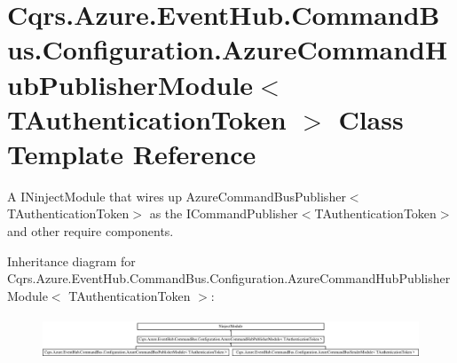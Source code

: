 \hypertarget{classCqrs_1_1Azure_1_1EventHub_1_1CommandBus_1_1Configuration_1_1AzureCommandHubPublisherModule}{}\section{Cqrs.\+Azure.\+Event\+Hub.\+Command\+Bus.\+Configuration.\+Azure\+Command\+Hub\+Publisher\+Module$<$ T\+Authentication\+Token $>$ Class Template Reference}
\label{classCqrs_1_1Azure_1_1EventHub_1_1CommandBus_1_1Configuration_1_1AzureCommandHubPublisherModule}


A I\+Ninject\+Module that wires up Azure\+Command\+Bus\+Publisher$<$\+T\+Authentication\+Token$>$ as the I\+Command\+Publisher$<$\+T\+Authentication\+Token$>$ and other require components.  


Inheritance diagram for Cqrs.\+Azure.\+Event\+Hub.\+Command\+Bus.\+Configuration.\+Azure\+Command\+Hub\+Publisher\+Module$<$ T\+Authentication\+Token $>$\+:\begin{figure}[H]
\begin{center}
\leavevmode
\includegraphics[height=1.274658cm]{classCqrs_1_1Azure_1_1EventHub_1_1CommandBus_1_1Configuration_1_1AzureCommandHubPublisherModule}
\end{center}
\end{figure}
